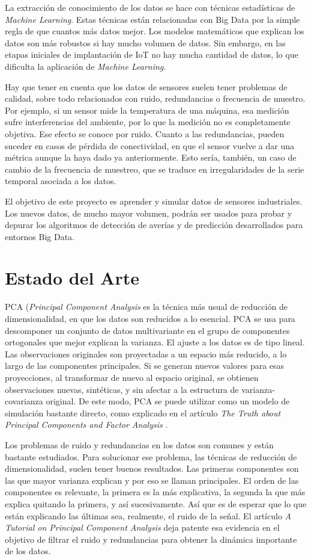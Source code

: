 \documentclass[11pt,spanish,listoffigures,listoftables]{tfgetsinf}
\begin{document}
La extracción de conocimiento de los datos se hace con técnicas estadísticas de {\em Machine Learning}. Estas técnicas están relacionadas con Big Data por la simple regla de que cuantos más datos mejor. Los modelos matemáticos que explican los datos son más robustos si hay mucho volumen de datos. Sin embargo, en las etapas iniciales de implantación de IoT no hay mucha cantidad de datos, lo que dificulta la aplicación de {\em Machine Learning}.

Hay que tener en cuenta que los datos de sensores suelen tener problemas de calidad, sobre todo relacionados con ruido, redundancias o frecuencia de muestro. Por ejemplo, si un sensor mide la temperatura de una máquina, esa medición sufre interferencias del ambiente, por lo que la medición no es completamente objetiva. Ese efecto se conoce por ruido. Cuanto a las redundancias, pueden suceder en casos de pérdida de conectividad, en que el sensor vuelve a dar una métrica aunque la haya dado ya anteriormente. Esto sería, también, un caso de cambio de la frecuencia de muestreo, 	que se traduce en irregularidades de la serie temporal asociada a los datos. 

El objetivo de este proyecto es aprender y simular datos de sensores industriales. Los nuevos datos, de mucho mayor volumen, podrán ser usados para probar y depurar los algoritmos de detección de averías y de predicción desarrollados para entornos Big Data. 

\chapter{Estado del Arte}
PCA ({\em Principal Component Analysis} es la técnica más usual de reducción de dimensionalidad, en que los datos son reducidos a lo esencial. PCA se usa para descomponer un conjunto de datos multivariante en el grupo de componentes ortogonales que mejor explican la varianza. El ajuste a los datos es de tipo lineal. Las observaciones originales son proyectadas a un espacio más reducido, a lo largo de las componentes principales. Si se generan nuevos valores para esas proyecciones, al transformar de nuevo al espacio original, se obtienen observaciones nuevas, sintéticas, y sin afectar a la estructura de varianza-covarianza original. De este modo, PCA se puede utilizar como un modelo de simulación bastante directo, como explicado en el artículo {\em The Truth about Principal Components and Factor Analysis} \cite{light}.

Los problemas de ruido y redundancias en los datos son comunes y están bastante estudiados. Para solucionar ese problema, las técnicas de reducción de dimensionalidad, suelen tener buenos resultados. Las primeras componentes son las que mayor varianza explican y por eso se llaman principales. El orden de las componentes es relevante, la primera es la más explicativa, la segunda la que más explica quitando la primera, y así sucesivamente. Así que es de esperar que lo que están explicando las últimas sea, realmente, el ruido de la señal. El artículo \textit{A Tutorial on Principal Component Analysis} \cite{shlens} deja patente esa evidencia en el objetivo de filtrar el ruido y redundancias para obtener la dinámica importante de los datos.
\end{document}
